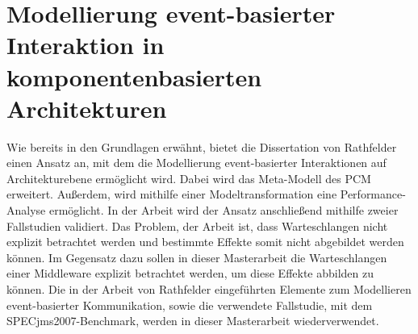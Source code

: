 \section{Modellierung event-basierter Interaktion in komponentenbasierten Architekturen}
Wie bereits in den Grundlagen erwähnt, bietet die Dissertation von Rathfelder \cite{Rathfelder2013} einen Ansatz an, mit dem die Modellierung event-basierter Interaktionen auf Architekturebene ermöglicht wird. Dabei wird das Meta-Modell des PCM erweitert. Außerdem, wird mithilfe einer Modeltransformation eine Performance-Analyse ermöglicht. In der Arbeit wird der Ansatz anschließend mithilfe zweier Fallstudien validiert. Das Problem, der Arbeit ist, dass Warteschlangen nicht explizit betrachtet werden und bestimmte Effekte somit nicht abgebildet werden können. Im Gegensatz dazu sollen in dieser Masterarbeit die Warteschlangen einer Middleware explizit betrachtet werden, um diese Effekte abbilden zu können. Die in der Arbeit von Rathfelder eingeführten Elemente zum Modellieren event-basierter Kommunikation, sowie die verwendete Fallstudie, mit dem SPECjms2007-Benchmark, werden in dieser Masterarbeit wiederverwendet.